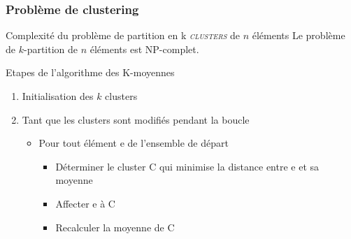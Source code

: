 \documentclass{beamer}
\begin{document}
\begin{frame}
\frametitle{Problème de clustering}

\begin{alertblock}{Complexité du problème de partition en k \textsc{\it clusters} de $n$ éléments}
Le problème de $k$-partition de $n$ éléments est NP-complet.
\end{alertblock}


\begin{block}{Etapes de l'algorithme des K-moyennes}
\begin{enumerate}
\item Initialisation des $k$ clusters
\item Tant que les clusters sont modifiés pendant la boucle
       \begin{itemize}
       \item Pour tout élément e de l'ensemble de départ
             \begin{itemize}   
             \item Déterminer le cluster C qui minimise la distance entre e et sa moyenne
             \item Affecter e à C
             \item Recalculer la moyenne de C
             \end{itemize}
       \end{itemize}
\end{enumerate}
\end{block}



\end{frame}
\end{document}

